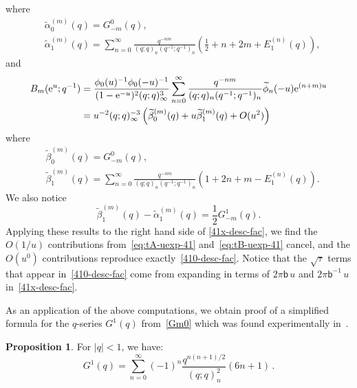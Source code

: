 \documentclass[12pt,reqno]{amsart}
\theoremstyle{definition}
\newtheorem{proposition}[theorem]{Proposition}
\def\bb{\mathsf{b}}
\def\wt{\widetilde}
\def\re{{\rm e}}
\def\cO{O}
\newcommand{\nn}{\nonumber \\}
\begin{document}
where
\begin{subequations}
\begin{align}
  &\wt{\alpha}^{(m)}_0(q) = G_{-m}^0(q),\label{eq:ta0-41}\\
  &\wt{\alpha}^{(m)}_1(q) = \sum_{n=0}^\infty
    \frac{q^{-nm}}{(q;q)_n(q^{-1};q^{-1})_n}
    \left(\frac{1}{2}+n+2m+E_1^{(n)}(q)\right),\label{eq:ta1-41}
\end{align}
\end{subequations}
and
\begin{align}
  B_m(\re^u;q^{-1})
  &=
  \frac{\phi_0(u)^{-1}\phi_0(-u)^{-1}}{(1-\re^{-u})^2(q;q)_\infty^3}
    \sum_{n=0}^\infty\frac{q^{-nm}}{(q;q)_n(q^{-1};q^{-1})_n}
    \wt{\phi}_n(-u)\re^{(n+m)u} \nn
  &=
  u^{-2}(q;q)_\infty^{-3}\left(\wt{\beta}^{(m)}_0(q)+u
    \wt{\beta}^{(m)}_1(q) + \cO(u^2)\right)
    \label{eq:tB-uexp-41}
\end{align}
where
\begin{subequations}
\begin{align}
  &\wt{\beta}^{(m)}_0(q) = G_{-m}^0(q),\label{eq:tb0-41}\\
  &\wt{\beta}^{(m)}_1(q) = \sum_{n=0}^\infty
    \frac{q^{-nm}}{(q;q)_n(q^{-1};q^{-1})_n}
    (1+2n+m-E_1^{(n)}(q)).\label{eq:tb1-41}
\end{align}
\end{subequations}
We also notice
\begin{equation}
  \wt{\beta}_1^{(m)}(q) - \wt{\alpha}_1^{(m)}(q) =
  \frac{1}{2} G_{-m}^1(q).
\end{equation}
Applying these results to the right hand side of \eqref{41x-desc-fac},
we find the $O(1/u)$ contributions from~\eqref{eq:tA-uexp-41}
and~\eqref{eq:tB-uexp-41} cancel, and the $O(u^0)$ contributions
reproduce exactly~\eqref{410-desc-fac}. Notice that the $\sqrt{\tau}$
terms that appear in~\eqref{410-desc-fac} come from expanding in terms
of $2\pi\bb\,u$ and $2\pi\bb^{-1}\,u$ in~\eqref{41x-desc-fac}.
    
As an application of the above computations, we obtain proof of a
simplified formula for the $q$-series $G^1(q)$ from~\eqref{Gm0} which
was found experimentally in~\cite{GZ:qseries}.

\begin{proposition}
  \label{prop.G}
  For $|q|<1$, we have:
  \begin{equation}
  \label{GGformula}
  G^1(q) = \sum_{n=0}^\infty (-1)^n \frac{q^{n(n+1)/2}}{(q;q)_n^2}
  (6n+1) \,.
  \end{equation}
\end{proposition}
\end{document}

